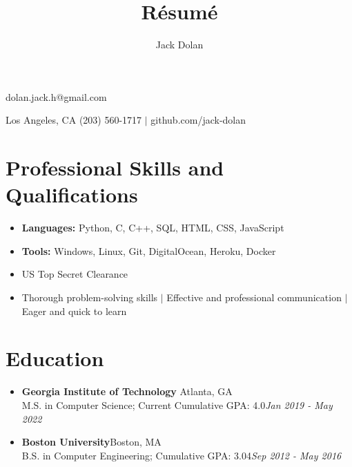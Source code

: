 \documentclass{article}
\makeatletter
\renewcommand{\maketitle}{ 
{\huge\bfseries\theauthor}\hfill dolan.jack.h@gmail.com 

\vspace{0.2em} 

Los Angeles, CA \hfill (203) 560-1717 $|$ github.com/jack-dolan
}
\makeatother
\begin{document}
 
\title{R\'esum\'e} 
\author{Jack Dolan} 
\maketitle
{}


\section{Professional Skills and Qualifications} \begin{itemize}
    \itemsep0em
    \item \textbf{Languages:} Python, C, C++, SQL, HTML, CSS, JavaScript
    \item \textbf{Tools:} Windows, Linux, Git, DigitalOcean, Heroku, Docker
    \item US Top Secret Clearance
    \item Thorough problem-solving skills $|$ Effective and professional communication $|$ Eager and quick to learn \end{itemize} 


\section{Education} \begin{itemize}
    \itemsep0.2em
    \item \textbf{Georgia Institute of Technology} \hfill Atlanta, GA\\M.S. in Computer Science; Current Cumulative GPA: 4.0\hfill \emph{Jan 2019 - May 2022}
    \item \textbf{Boston University}\hfill Boston, MA\\B.S. in Computer Engineering; Cumulative GPA: 3.04\hfill \emph{Sep 2012 - May 2016} \end{itemize} 
\end{document}
